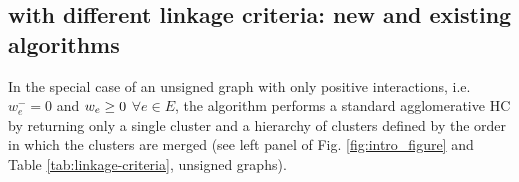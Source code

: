 



            



\subsection{\algname{} with different linkage criteria: new and existing algorithms} \label{sec:alg_update_rules}

In the special case of an unsigned graph with only positive interactions, i.e. $w_e^-=0$ and $w_e \geq 0$ $\forall e\in E$, %
 the algorithm performs a standard agglomerative HC by returning only a single cluster and a hierarchy of clusters defined by the order in which the clusters are merged (see left panel of Fig. \hyperref[fig:intro_figure]{\ref*{fig:intro_figure}} and Table \ref{tab:linkage-criteria}, unsigned graphs).

